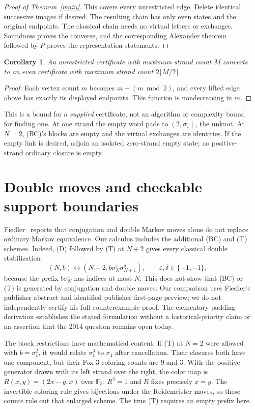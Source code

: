 \documentclass[11pt]{article}
\newtheorem{corollary}[theorem]{Corollary}
\newcommand{\sig}{\sigma}
\newcommand{\arr}{\longleftrightarrow}
\begin{document}
\begin{proof}[Proof of Theorem~\ref{main}]
This covers every unrestricted edge. Delete identical successive images if
desired. The resulting chain has only even states and the original endpoints.
The classical chain needs no virtual letters or exchanges. Soundness proves the
converse, and the corresponding Alexander theorem followed by $P$ proves the
representation statements.
\end{proof}

\begin{corollary}
An unrestricted certificate with maximum strand count $M$ converts to an even
certificate with maximum strand count $2\lceil M/2\rceil$.
\end{corollary}
\begin{proof}
Each vertex count $m$ becomes $m+(m\bmod2)$, and every lifted edge above has
exactly its displayed endpoints. This function is nondecreasing in $m$.
\end{proof}
This is a bound for a \emph{supplied} certificate, not an algorithm or complexity
bound for finding one. At one strand the empty word pads to $(2,\sig_1)$,
the unknot. At $N=2$, (BC)'s blocks are empty and the virtual exchanges are
identities. If the empty link is desired, adjoin an isolated zero-strand empty
state; no positive-strand ordinary closure is empty.

\section{Double moves and checkable support boundaries}
Fiedler~\cite{Fiedler} reports that conjugation and double Markov moves alone
do not replace ordinary Markov equivalence. Our calculus includes the additional
(BC) and (T) schemes. Indeed, (D) followed by (T) at $N+2$ gives every classical
double stabilization
\[
 (N,b)\arr (N+2,b\sig_N^\varepsilon\sig_{N+1}^\delta),
 \qquad \varepsilon,\delta\in\{+1,-1\},
\]
because the prefix $b\sig_N^\varepsilon$ has indices at most $N$.
This does not show that (BC) or (T) is generated by conjugation and double moves.
Our comparison uses Fiedler's publisher abstract and identified publisher
first-page preview; we do not independently certify his full counterexample
proof. The elementary padding derivation establishes the stated formulation
without a historical-priority claim or an assertion that the 2014 question
remains open today.

The block restrictions have mathematical content. If (T) at $N=2$ were allowed
with $b=\sig_1^2$, it would relate $\sig_1^3$ to $\sig_1$ after cancellation.
Their closures both have one component, but their Fox $3$-coloring counts are
$9$ and $3$. With the positive generator drawn with its left strand over the right,
the color map is $R(x,y)=(2x-y,x)$ over $\mathbb F_3$; $R^3=1$ and $R$ fixes precisely $x=y$.
The invertible coloring rule gives bijections under the Reidemeister moves,
so these counts rule out that enlarged scheme. The true (T) requires an empty
prefix here.
\end{document}
